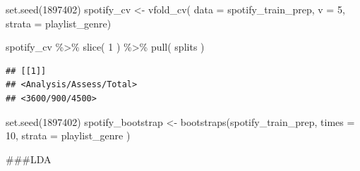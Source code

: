 \documentclass[
]{article}
\newenvironment{Shaded}{\begin{snugshade}}{\end{snugshade}}
\newcommand{\AttributeTok}[1]{\textcolor[rgb]{0.77,0.63,0.00}{#1}}
\newcommand{\DecValTok}[1]{\textcolor[rgb]{0.00,0.00,0.81}{#1}}
\newcommand{\FunctionTok}[1]{\textcolor[rgb]{0.00,0.00,0.00}{#1}}
\newcommand{\NormalTok}[1]{#1}
\newcommand{\OtherTok}[1]{\textcolor[rgb]{0.56,0.35,0.01}{#1}}
\newcommand{\SpecialCharTok}[1]{\textcolor[rgb]{0.00,0.00,0.00}{#1}}
\begin{document}
\begin{Shaded}
\begin{Highlighting}[]
\FunctionTok{set.seed}\NormalTok{(}\DecValTok{1897402}\NormalTok{)}
\NormalTok{spotify\_cv }\OtherTok{\textless{}{-}} \FunctionTok{vfold\_cv}\NormalTok{( }
 \AttributeTok{data =}\NormalTok{ spotify\_train\_prep, }
 \AttributeTok{v =} \DecValTok{5}\NormalTok{, }
 \AttributeTok{strata =}\NormalTok{ playlist\_genre)}

\NormalTok{spotify\_cv }\SpecialCharTok{\%\textgreater{}\%}
  \FunctionTok{slice}\NormalTok{( }\DecValTok{1}\NormalTok{ ) }\SpecialCharTok{\%\textgreater{}\%}
 \FunctionTok{pull}\NormalTok{( splits ) }
\end{Highlighting}
\end{Shaded}

\begin{verbatim}
## [[1]]
## <Analysis/Assess/Total>
## <3600/900/4500>
\end{verbatim}

\begin{Shaded}
\begin{Highlighting}[]
\FunctionTok{set.seed}\NormalTok{(}\DecValTok{1897402}\NormalTok{)}
\NormalTok{spotify\_bootstrap }\OtherTok{\textless{}{-}} \FunctionTok{bootstraps}\NormalTok{(spotify\_train\_prep, }\AttributeTok{times =} \DecValTok{10}\NormalTok{,  }\AttributeTok{strata =}\NormalTok{ playlist\_genre )}
\end{Highlighting}
\end{Shaded}

\#\#\#LDA
\end{document}
